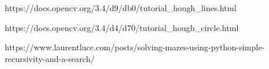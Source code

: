 \documentclass[conference]{IEEEtran}
\begin{document}
\begin{thebibliography}{00}
 https://docs.opencv.org/3.4/d9/db0/tutorial_hough_lines.html

 https://docs.opencv.org/3.4/d4/d70/tutorial_hough_circle.html

 https://www.laurentluce.com/posts/solving-mazes-using-python-simple-recursivity-and-a-search/
\end{thebibliography}
\end{document}

